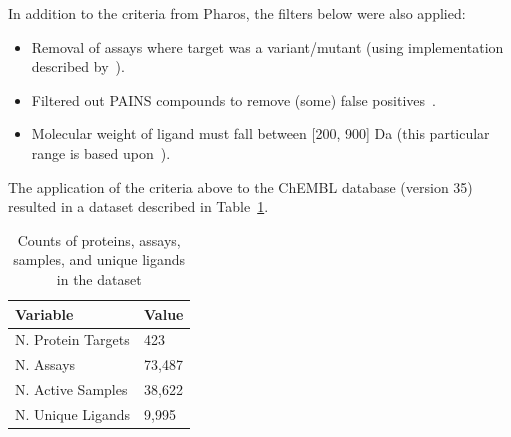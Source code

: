 \documentclass[11pt]{article}
\begin{document}
In addition to the criteria from Pharos, the filters below were also applied:
\begin{itemize}
    \item Removal of assays where target was a variant/mutant (using implementation described by~\cite{landrum_riniker_2024}).
    \item Filtered out PAINS compounds to remove (some) false positives~\cite{baell_holloway_2010}.
    \item Molecular weight of ligand must fall between [200, 900] Da (this particular range is based upon~\cite{filip_miljkovic_jurgen_bajorath_2018}). 
\end{itemize}

The application of the criteria above to the ChEMBL database (version 35) resulted in a dataset described in Table~\ref{tab:1}.

\begin{table}[!ht]
\centering
\begin{tabular}{|l|l|}
    \hline
    \textbf{Variable} & \textbf{Value} \\ \hline
    N. Protein Targets & 423 \\ \hline
    N. Assays & 73,487 \\ \hline
    N. Active Samples & 38,622 \\ \hline
    N. Unique Ligands & 9,995 \\ \hline
\end{tabular}
\caption{Counts of proteins, assays, samples, and unique ligands in the dataset}\label{tab:1}
\end{table}
\end{document}
